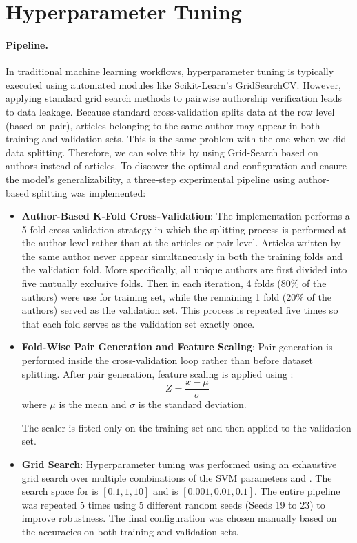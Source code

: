 \documentclass[11pt]{article}
\newcommand{\code}[1]{%
  \tcbox[on line, colback=codebg, colframe=codebg,
         boxrule=0pt, arc=2pt, left=2pt, right=2pt, top=0pt, bottom=0pt]
        {\ttfamily\small #1}}
\begin{document}
\section{Hyperparameter Tuning}

\paragraph{Pipeline.}
In traditional machine learning workflows, hyperparameter tuning is typically executed using automated modules like Scikit-Learn’s GridSearchCV. However, applying standard grid search methods to pairwise authorship verification leads to data leakage. Because standard cross-validation splits data at the row level (based on pair), articles belonging to the same author may appear in both training and validation sets. This is the same problem with the one when we did data splitting. Therefore, we can solve this by using Grid-Search based on authors instead of articles. To discover the optimal \code{C} and \code{$\gamma$} configuration and ensure the model's generalizability, a three-step experimental pipeline using author-based splitting was implemented:
\begin{itemize}\setlength\itemsep{1pt}
  \item \textbf{Author-Based K-Fold Cross-Validation}: The implementation performs a 5-fold cross validation strategy in which the splitting process is performed at the author level rather than at the articles or pair level. Articles written by the same author never appear simultaneously in both the training folds and the validation fold. More specifically, all unique authors are first divided into five mutually exclusive folds. Then in each iteration, 4 folds (80\% of the authors) were use for training set, while the remaining 1 fold (20\% of the authors) served as the validation set. This process is repeated five times so that each fold serves as the validation set exactly once.
  \item \textbf{Fold-Wise Pair Generation and Feature Scaling}: Pair generation is performed inside the cross-validation loop rather than before dataset splitting. After pair generation, feature scaling is applied using \code{StandardScaler}:
  \[
    Z = \frac{x - \mu}{\sigma}
  \]
  where $\mu$ is the mean and $\sigma$ is the standard deviation. 
  
  The scaler is fitted only on the training set and then applied to the validation set.
  \item \textbf{Grid Search}: Hyperparameter tuning was performed using an exhaustive grid search over multiple combinations of the SVM parameters \code{C} and \code{$\gamma$}. The search space for \code{C} is $[0.1, 1, 10]$ and \code{$\gamma$} is $[0.001, 0.01, 0.1]$. The entire pipeline was repeated 5 times using 5 different random seeds (Seeds 19 to 23) to improve robustness. The final configuration was chosen manually based on the accuracies on both training and validation sets. 
\end{itemize}
\end{document}
